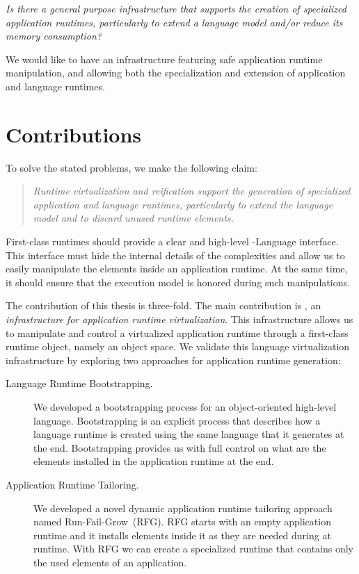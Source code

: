 \begin{center}\emph{Is there a general purpose infrastructure that supports the creation of specialized application runtimes, particularly to extend a language model and/or reduce its memory consumption?}
\end{center}

We would like to have an infrastructure featuring safe application runtime manipulation, and allowing both the specialization and extension of application and language runtimes.

\section{Contributions}

To solve the stated problems, we make the following claim: \newline

\begin{center}\blockquote{\emph{Runtime virtualization and reification support the generation of specialized application and language runtimes, particularly to extend the language model and to discard unused runtime elements.}}
\end{center}

First-class runtimes should provide a clear and high-level \VM-Language interface. This interface must hide the internal details of the \VM complexities and allow us to easily manipulate the elements inside an application runtime. At the same time, it should ensure that the \VM execution model is honored during such manipulations.

The contribution of this thesis is three-fold. The main contribution is \Vtt, an \emph{infrastructure for application runtime virtualization}. This infrastructure allows us to manipulate and control a virtualized application runtime through a first-class runtime object, namely an object space.
We validate this language virtualization infrastructure by exploring two approaches for application runtime generation:
\begin{description}
\item[Language Runtime Bootstrapping.] We developed a bootstrapping process for an object-oriented high-level language. Bootstrapping is an explicit process that describes how a language runtime is created using the same language that it generates at the end. Bootstrapping provides us with full control on what are the elements installed in the application runtime at the end.
\item[Application Runtime Tailoring.] We developed a novel dynamic application runtime tailoring approach named Run-Fail-Grow~(RFG). RFG starts with an empty application runtime and it installs elements inside it as they are needed during at runtime. With RFG we can create a specialized runtime that contains only the used elements of an application.
\end{description}

